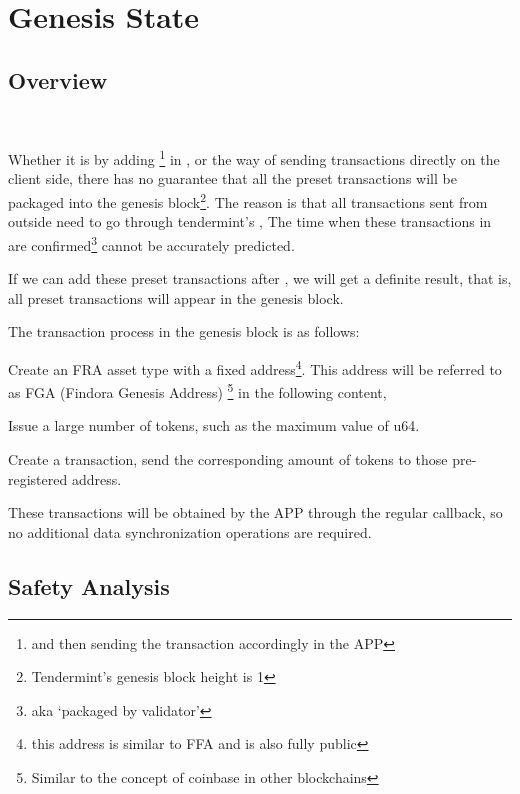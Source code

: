 \clearpage

\section{Genesis State}

\subsection{Overview}

~\par

Whether it is by adding \footnote{and then sending the transaction accordingly in the APP}
in ,
or the way of sending transactions directly on the client side, there has no guarantee that all the preset
transactions will be packaged into the genesis block\footnote{Tendermint's genesis block height is 1}.
The reason is that all transactions sent from outside need to go through tendermint's ,
The time when these transactions in  are confirmed\footnote{aka `packaged by validator'} cannot be accurately predicted.

If we can add these preset transactions after , we will get a definite result,
that is, all preset transactions will appear in the genesis block.

The transaction process in the genesis block is as follows:

\begin{ENUMERATE}
    \item Create an FRA asset type with a fixed address\footnote {this address is similar to FFA and is also fully public}.
            This address will be referred to as FGA (Findora Genesis Address)
            \footnote{Similar to the concept of coinbase in other blockchains} in the following content,
    \item Issue a large number of tokens, such as the maximum value of u64.
    \item Create a transaction, send the corresponding amount of tokens to those pre-registered address.
    \item These transactions will be obtained by the APP through the regular
             callback, so no additional data synchronization operations are required.
\end{ENUMERATE}

\subsection{Safety Analysis}

